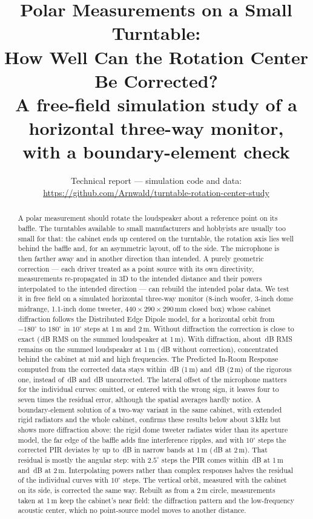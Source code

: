\documentclass[11pt,a4paper]{article}
\title{Polar Measurements on a Small Turntable:\\How Well Can the Rotation Center Be Corrected?\\[4pt]
\large A free-field simulation study of a horizontal three-way monitor,\\with a boundary-element check}
\author{}
\date{Technical report --- simulation code and data:\\
\url{https://github.com/Arnwald/turntable-rotation-center-study}}
\begin{document}
\maketitle

\begin{abstract}
A polar measurement should rotate the loudspeaker about a reference point on its baffle. The
turntables available to small manufacturers and hobbyists are usually too small for that: the
cabinet ends up centered on the turntable, the rotation axis lies well behind the baffle and, for
an asymmetric layout, off to the side. The microphone is then farther away and in another
direction than intended. A purely geometric correction --- each driver treated as a point source
with its own directivity, measurements re-propagated in 3D to the intended distance and their powers
interpolated to the intended direction --- can rebuild the intended polar data. We test it in free
field on a simulated horizontal three-way monitor (8-inch woofer, 3-inch dome midrange, 1.1-inch dome
tweeter, $440\times290\times290$\,mm closed box) whose cabinet diffraction follows the
Distributed Edge Dipole model, for a horizontal orbit from $-180^\circ$ to $180^\circ$ in
$10^\circ$ steps at 1\,m and 2\,m. Without diffraction the correction is close to exact
(\sysDirCorOne\,dB RMS on the summed loudspeaker at 1\,m). With diffraction, about \sysCorOne\,dB RMS
remains on the summed loudspeaker at 1\,m (\sysRawOne\,dB without correction), concentrated behind the
cabinet at mid and high frequencies. The Predicted In-Room Response computed from the corrected data
stays within \pirCorOne\,dB (1\,m) and \pirCorTwo\,dB (2\,m) of the rigorous one, instead of \pirRawOne\,dB
and \pirRawTwo\,dB uncorrected. The lateral offset of the microphone matters for the individual curves:
omitted, or entered with the wrong sign, it leaves four to seven times the residual error, although the
spatial averages hardly notice. A boundary-element solution of a two-way variant in the same cabinet,
with extended rigid radiators and the whole cabinet, confirms these results below about 3\,kHz but shows
more diffraction above: the rigid dome tweeter radiates wider than its aperture model, the far edge of
the baffle adds fine interference ripples, and with $10^\circ$ steps the corrected PIR deviates by up to
\bemPirCorOne\,dB in narrow bands at 1\,m (\bemPirCorTwo\,dB at 2\,m). That residual is mostly the angular
step: with $2.5^\circ$ steps the PIR comes within \bemPirFineOne\,dB at 1\,m and \bemPirFineTwo\,dB at 2\,m.
Interpolating powers rather than complex responses halves the residual of the individual curves with
$10^\circ$ steps. The vertical orbit, measured with the cabinet on its side, is corrected the same way.
Rebuilt as from a 2\,m circle, measurements taken at 1\,m keep the cabinet's near field: the diffraction
pattern and the low-frequency acoustic center, which no point-source model moves to another distance.
\end{abstract}
\end{document}
